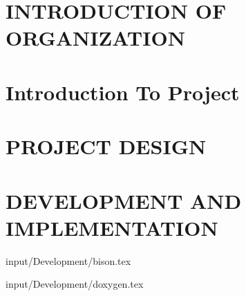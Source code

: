 \documentclass[12pt]{report}
\begin{document}

\begin{screen}
\ppttitle
\end{screen}

\thispagestyle{empty} 
\pagetitle
\newpage
{}
\cfoot{\thepage}


\newpage


\newpage
\tableofcontents
\newpage
\listoffigures
\newpage
\listoftables
\newpage


\cfoot{\thepage}

\newpage
\chapter{INTRODUCTION OF ORGANIZATION}

\newpage


\chapter{Introduction To Project}








\chapter{PROJECT DESIGN}








\newpage
\chapter{DEVELOPMENT AND IMPLEMENTATION}


 {input/Development/bison.tex}


%
%
%

 {input/Development/doxygen.tex}



\end{document}
